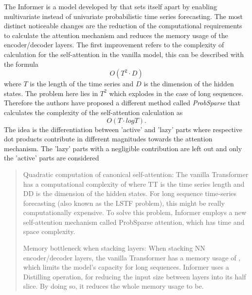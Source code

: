 \documentclass{article}
\begin{document}
The Informer is a model developed by \cite{Informer} that sets itself apart by enabling multivariate instead of univariate probabilistic time series forecasting. The most distinct noticeable changes are the reduction of the computational requirements to calculate the attention mechanism and reduces the memory usage of the encoder/decoder layers. The first improvement refers to the complexity of calculation for the self-attention in the vanilla model, this can be described with the formula
\begin{equation*}
    O(T^2 \cdot D)
\end{equation*}
where $T$ is the length of the time series and $D$ is the dimension of the hidden states. The problem here lies in $T^2$ which explodes in the case of long sequences. Therefore the authors have proposed a different method called \textit{ProbSparse} that calculates the complexity of the self-attention calculation as
\begin{equation*}
    O(T \cdot log{T}) .
\end{equation*}
The idea is the differentiation between 'active' and 'lazy' parts where respective dot products contribute in different magnitudes towards the attention mechanism. The 'lazy' parts with a negligible contribution are left out and only the 'active' parts are considered
\begin{quote}
    Quadratic computation of canonical self-attention:
    The vanilla Transformer has a computational complexity of  where TT is the time series length and DD is the dimension of the hidden states. For long sequence time-series forecasting (also known as the LSTF problem), this might be really computationally expensive. To solve this problem, Informer employs a new self-attention mechanism called ProbSparse attention, which has time and space complexity.
    
    Memory bottleneck when stacking layers:
    When stacking NN encoder/decoder layers, the vanilla Transformer has a memory usage of , which limits the model's capacity for long sequences. Informer uses a Distilling operation, for reducing the input size between layers into its half slice. By doing so, it reduces the whole memory usage to be.
\end{quote}
\end{document}
